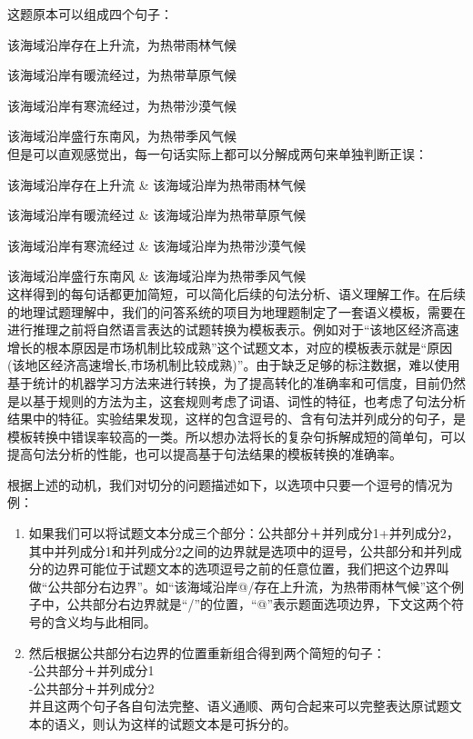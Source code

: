 \documentclass[master, winfont]{njuthesis}
\begin{document}
这题原本可以组成四个句子：\par
该海域沿岸存在上升流，为热带雨林气候\par
该海域沿岸有暖流经过，为热带草原气候\par
该海域沿岸有寒流经过，为热带沙漠气候\par
该海域沿岸盛行东南风，为热带季风气候\\

但是可以直观感觉出，每一句话实际上都可以分解成两句来单独判断正误：\par
该海域沿岸存在上升流 \& 该海域沿岸为热带雨林气候\par
该海域沿岸有暖流经过 \& 该海域沿岸为热带草原气候\par
该海域沿岸有寒流经过 \& 该海域沿岸为热带沙漠气候\par
该海域沿岸盛行东南风 \& 该海域沿岸为热带季风气候\\

这样得到的每句话都更加简短，可以简化后续的句法分析、语义理解工作。在后续的地理试题理解中，我们的问答系统的项目为地理题制定了一套语义模板，需要在进行推理之前将自然语言表达的试题转换为模板表示。例如对于“该地区经济高速增长的根本原因是市场机制比较成熟”这个试题文本，对应的模板表示就是“原因(该地区经济高速增长,市场机制比较成熟)”。由于缺乏足够的标注数据，难以使用基于统计的机器学习方法来进行转换，为了提高转化的准确率和可信度，目前仍然是以基于规则的方法为主，这套规则考虑了词语、词性的特征，也考虑了句法分析结果中的特征。实验结果发现，这样的包含逗号的、含有句法并列成分的句子，是模板转换中错误率较高的一类。所以想办法将长的复杂句拆解成短的简单句，可以提高句法分析的性能，也可以提高基于句法结果的模板转换的准确率。

根据上述的动机，我们对切分的问题描述如下，以选项中只要一个逗号的情况为例：
\begin{enumerate}
	\item 如果我们可以将试题文本分成三个部分：公共部分＋并列成分1+并列成分2，其中并列成分1和并列成分2之间的边界就是选项中的逗号，公共部分和并列成分的边界可能位于试题文本的选项逗号之前的任意位置，我们把这个边界叫做“公共部分右边界”。如“该海域沿岸@/存在上升流，为热带雨林气候”这个例子中，公共部分右边界就是“/”的位置，“@”表示题面选项边界，下文这两个符号的含义均与此相同。
	\item 然后根据公共部分右边界的位置重新组合得到两个简短的句子：\\
		-公共部分＋并列成分1\\
		-公共部分＋并列成分2\\
		并且这两个句子各自句法完整、语义通顺、两句合起来可以完整表达原试题文本的语义，则认为这样的试题文本是可拆分的。
\end{enumerate}
\end{document}
